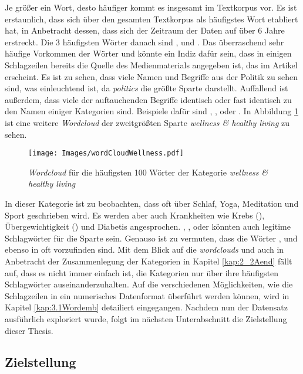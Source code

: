 \documentclass[a4paper,11pt]{article}
\begin{document}
Je größer ein Wort, desto häufiger kommt es insgesamt im Textkorpus vor. Es ist erstaunlich, dass  sich über den gesamten Textkorpus als häufigstes Wort etabliert hat, in Anbetracht dessen, dass sich der Zeitraum der Daten auf über $6$ Jahre erstreckt. Die $3$ häufigsten Wörter danach sind ,  und . Das überraschend sehr häufige Vorkommen der Wörter  und  könnte ein Indiz dafür sein, dass in einigen Schlagzeilen bereits die Quelle des Medienmaterials angegeben ist, das im Artikel erscheint. Es ist zu sehen, dass viele Namen und Begriffe aus der Politik zu sehen sind, was einleuchtend ist, da \textit{politics} die größte Sparte darstellt. 
Auffallend ist außerdem, dass viele der auftauchenden Begriffe identisch oder fast identisch zu den Namen einiger Kategorien sind. Beispiele dafür sind , ,  oder . In Abbildung \ref{abb:WordcloudWellness} ist eine weitere \textit{Wordcloud} der zweitgrößten Sparte \textit{wellness \& healthy living} zu sehen.

\begin{figure}[ht]
    \centering
\texttt{[image: Images/wordCloudWellness.pdf]} 
\caption{\textit{Wordcloud} für die häufigsten 100 Wörter der Kategorie \textit{wellness \& healthy living}}
\label{abb:WordcloudWellness}
\end{figure}

In dieser Kategorie ist zu beobachten, dass oft über Schlaf, Yoga, Meditation und Sport geschrieben wird. Es werden aber auch Krankheiten wie Krebs (), Übergewichtigkeit () und Diabetis angesprochen. , ,  oder  könnten auch legitime Schlagwörter für die  Sparte sein. Genauso ist zu vermuten, dass die Wörter ,  und  ebenso in  oft vorzufinden sind. Mit dem Blick auf die \textit{wordclouds} und auch in Anbetracht der Zusammenlegung der Kategorien in Kapitel \ref{kap:2_2Aend} fällt auf, dass es nicht immer einfach ist, die Kategorien nur über ihre häufigsten Schlagwörter auseinanderzuhalten. Auf die verschiedenen Möglichkeiten, wie die Schlagzeilen in ein numerisches Datenformat überführt werden können, wird in Kapitel \ref{kap:3.1Wordemb} detailiert eingegangen.
Nachdem nun der Datensatz ausführlich exploriert wurde, folgt im nächsten Unterabschnitt die Zielstellung dieser Thesis.


\subsection{Zielstellung} \label{Kap:Zielst}
\end{document}

